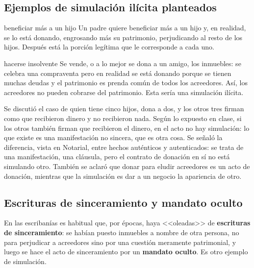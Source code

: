 \documentclass[12pt,oneside]{book}
\begin{document}
\subsection{Ejemplos de simulaci\'on il\'icita planteados}

\begin{example}{beneficiar m\'as a un hijo}
Un padre quiere beneficiar m\'as a un hijo y, en realidad, se lo est\'a donando, engrosando m\'as su patrimonio, perjudicando al resto de los hijos. Despu\'es est\'a la porci\'on leg\'itima que le corresponde a cada uno.
\end{example}

\begin{example}{hacerse insolvente}
Se vende, o a lo mejor se dona a un amigo, los inmuebles: se celebra una compraventa pero en realidad se est\'a donando porque se tienen muchas deudas y el patrimonio es prenda com\'un de todos los acreedores. As\'i, los acreedores no pueden cobrarse del patrimonio. Esta ser\'ia una simulaci\'on il\'icita.
\end{example}

\begin{note}
Se discuti\'o el caso de quien tiene cinco hijos, dona a dos, y los otros tres firman como que recibieron dinero y no recibieron nada. Seg\'un lo expuesto en clase, si los otros tambi\'en firman que recibieron el dinero, en el acto no hay simulaci\'on: lo que existe es una manifestaci\'on no sincera, que es otra cosa. Se se\~nal\'o la diferencia, vista en Notarial, entre hechos aut\'enticos y autenticados: se trata de una manifestaci\'on, una cl\'ausula, pero el contrato de donaci\'on en s\'i no est\'a simulando otro. Tambi\'en se aclar\'o que donar para eludir acreedores es un acto de donaci\'on, mientras que la simulaci\'on es dar a un negocio la apariencia de otro.
\end{note}


\subsection{Escrituras de sinceramiento y mandato oculto}

En las escriban\'ias es habitual que, por \'epocas, haya <<oleadas>> de \textbf{escrituras de sinceramiento}: se hab\'ian puesto inmuebles a nombre de otra persona, no para perjudicar a acreedores sino por una cuesti\'on meramente patrimonial, y luego se hace el acto de sinceramiento por un \textbf{mandato oculto}. Es otro ejemplo de simulaci\'on.
\end{document}
